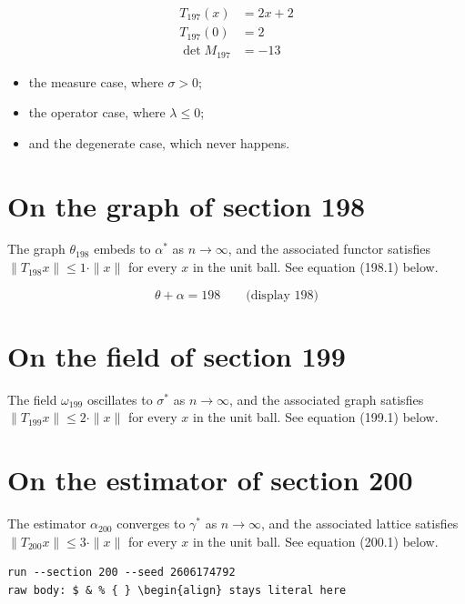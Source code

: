 \documentclass{article}
\begin{document}
\begin{align}
T_{197}(x) &= 2 x + 2 \\
T_{197}(0) &= 2 \\
\det M_{197} &= -13
\end{align}

\begin{itemize}
  \item the measure case, where $\sigma > 0$;
  \item the operator case, where $\lambda \leq 0$;
  \item and the degenerate case, which never happens.
\end{itemize}

\section{On the graph of section 198}
The graph $\theta_{198}$ embeds to $\alpha^{*}$ as $n \to \infty$,
and the associated functor satisfies $\|T_{198} x\| \leq 1 \cdot \|x\|$
for every $x$ in the unit ball. See equation (198.1) below.

$$
\theta + \alpha = 198 \qquad \text{(display 198)}
$$

\section{On the field of section 199}
The field $\omega_{199}$ oscillates to $\sigma^{*}$ as $n \to \infty$,
and the associated graph satisfies $\|T_{199} x\| \leq 2 \cdot \|x\|$
for every $x$ in the unit ball. See equation (199.1) below.

\section{On the estimator of section 200}
The estimator $\alpha_{200}$ converges to $\gamma^{*}$ as $n \to \infty$,
and the associated lattice satisfies $\|T_{200} x\| \leq 3 \cdot \|x\|$
for every $x$ in the unit ball. See equation (200.1) below.

\begin{verbatim}
run --section 200 --seed 2606174792
raw body: $ & % { } \begin{align} stays literal here
\end{verbatim}
\end{document}
